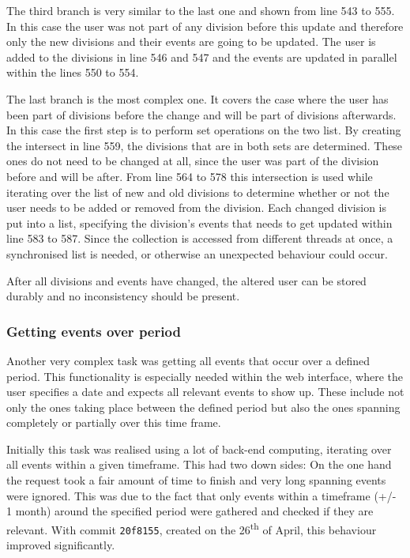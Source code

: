 The third branch is very similar to the last one and shown from line 543 to 555. In this case the user was not part of any division before this update and therefore only the new divisions and their events are going to be updated. The user is added to the divisions in line 546 and 547 and the events are updated in parallel within the lines 550 to 554. 

The last branch is the most complex one. It covers the case where the user has been part of divisions before the change and will be part of divisions afterwards. In this case the first step is to perform set operations on the two list. By creating the intersect in line 559, the divisions that are in both sets are determined. These ones do not need to be changed at all, since the user was part of the division before and will be after. From line 564 to 578 this intersection is used while iterating over the list of new and old divisions to determine whether or not the user needs to be added or removed from the division. Each changed division is put into a list, specifying the division's events that needs to get updated within line 583 to 587. Since the collection is accessed from different threads at once, a synchronised list is needed, or otherwise an unexpected behaviour could occur.

After all divisions and events have changed, the altered user can be stored durably and no inconsistency should be present.

\subsubsection{Getting events over period}

Another very complex task was getting all events that occur over a defined period. This functionality is especially needed within the web interface, where the user specifies a date and expects all relevant events to show up. These include not only the ones taking place between the defined period but also the ones spanning completely or partially over this time frame.

Initially this task was realised using a lot of back-end computing, iterating over all events within a given timeframe. This had two down sides: On the one hand the request took a fair amount of time to finish and very long spanning events were ignored. This was due to the fact that only events within a timeframe (+/- 1 month) around the specified period were gathered and checked if they are relevant. With commit \texttt{20f8155}, created on the 26\textsuperscript{th} of April, this behaviour improved significantly.

